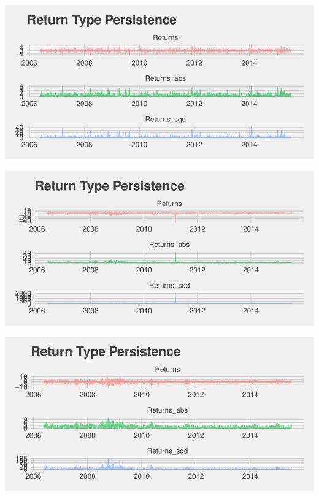 \documentclass[11pt,preprint, authoryear]{elsarticle}
\let\origfigure\figure
\let\endorigfigure\endfigure
\renewenvironment{figure}[1][2] {
    \expandafter\origfigure\expandafter[H]
} {
    \endorigfigure
}
\numberwithin{equation}{section}
\numberwithin{figure}{section}
\numberwithin{table}{section}
\begin{document}
\begin{figure}[H]
{}

\caption{FSR \label{fsr}}\label{fig:figure4}
\end{figure}\begin{figure}[H]

{\centering \includegraphics{Template_files/figure-latex/figure5-1} 

}

\caption{NBKP \label{nbkp}}\label{fig:figure5}
\end{figure}\begin{figure}[H]

{\centering \includegraphics{Template_files/figure-latex/figure6-1} 

}

\caption{RMH \label{rmh}}\label{fig:figure6}
\end{figure}\begin{figure}[H]

{\centering \includegraphics{Template_files/figure-latex/figure7-1} 

}
\end{figure}
\end{document}
